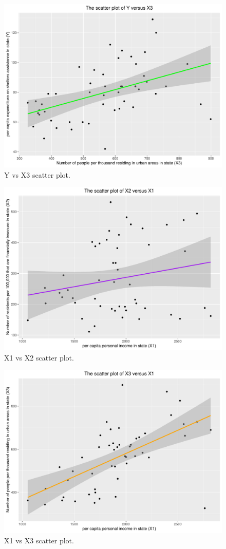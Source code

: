 \documentclass[12pt,letterpaper]{article}
\begin{document}
\begin{itemize}
\begin{figure}[h!]
\end{figure}
\begin{figure}[h!]\centering
	\caption{\footnotesize Y vs X3 scatter plot.}
	\label{fig:plot_1Y_vs_X3}
	\includegraphics[width=.75\textwidth]{Y_vs_X3_scatterplot.pdf}
\end{figure}
\begin{figure}[h!]\centering
	\caption{\footnotesize X1 vs X2 scatter plot.}
	\label{fig:plot_X1_vs_X2}
	\includegraphics[width=.75\textwidth]{X1_vs_X2_scatterplot.pdf}
\end{figure}
\begin{figure}[h!]\centering
	\caption{\footnotesize X1 vs X3 scatter plot.}
	\label{fig:plot_X1_vs_X3}
	\includegraphics[width=.75\textwidth]{X1_vs_X3_scatterplot.pdf}

\end{figure}
\end{itemize}
\end{document}
